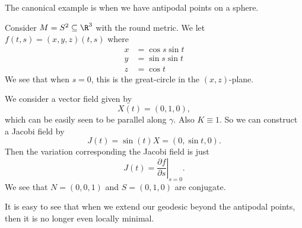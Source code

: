 \documentclass[a4paper]{article}
\begin{document}
The canonical example is when we have antipodal points on a sphere.
\begin{eg}
  Consider $M = S^2 \subseteq \R^3$ with the round metric. We let $f(t, s) = (x, y, z)(t, s)$ where
  \begin{align*}
    x &= \cos s \sin t\\
    y &= \sin s \sin t\\
    z &= \cos t
  \end{align*}
  We see that when $s = 0$, this is the great-circle in the $(x, z)$-plane.

  We consider a vector field given by
  \[
    X(t) = (0, 1, 0),
  \]
  which can be easily seen to be parallel along $\gamma$. Also $K \equiv 1$. So we can construct a Jacobi field by
  \[
    J(t) = \sin(t) X = (0, \sin t, 0).
  \]
  Then the variation corresponding the Jacobi field is just
  \[
    J(t) = \left.\frac{\partial f}{\partial s}\right|_{s = 0}.
  \]
  We see that $N = (0, 0, 1)$ and $S = (0, 1, 0)$ are conjugate.

  It is easy to see that when we extend our geodesic beyond the antipodal points, then it is no longer even locally minimal. %
\end{eg}
\end{document}
